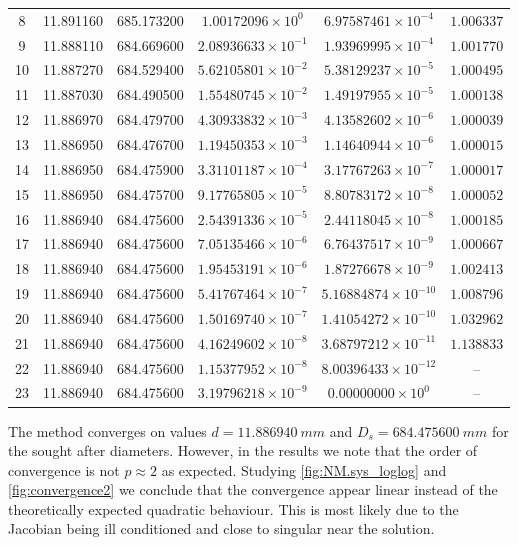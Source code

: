 \documentclass[11pt, a4paper]{article}
\theoremstyle{definition}
\begin{document}
\begin{table}[h!]
\begin{tabular}{cccccc}
 8  &  11.891160  & 685.173200  & $1.00172096\times 10^{0}$ & $6.97587461\times 10^{-4}$ & $1.006337$ \\
 9  &  11.888110  & 684.669600  & $2.08936633\times 10^{-1}$ & $1.93969995\times 10^{-4}$ & $1.001770$ \\
10  &  11.887270  & 684.529400  & $5.62105801\times 10^{-2}$ & $5.38129237\times 10^{-5}$ & $1.000495$ \\
11  &  11.887030  & 684.490500  & $1.55480745\times 10^{-2}$ & $1.49197955\times 10^{-5}$ & $1.000138$ \\
12  &  11.886970  & 684.479700  & $4.30933832\times 10^{-3}$ & $4.13582602\times 10^{-6}$ & $1.000039$ \\
13  &  11.886950  & 684.476700  & $1.19450353\times 10^{-3}$ & $1.14640944\times 10^{-6}$ & $1.000015$ \\
14  &  11.886950  & 684.475900  & $3.31101187\times 10^{-4}$ & $3.17767263\times 10^{-7}$ & $1.000017$ \\
15  &  11.886950  & 684.475700  & $9.17765805\times 10^{-5}$ & $8.80783172\times 10^{-8}$ & $1.000052$ \\
16  &  11.886940  & 684.475600  & $2.54391336\times 10^{-5}$ & $2.44118045\times 10^{-8}$ & $1.000185$ \\
17  &  11.886940  & 684.475600  & $7.05135466\times 10^{-6}$ & $6.76437517\times 10^{-9}$ & $1.000667$ \\
18  &  11.886940  & 684.475600  & $1.95453191\times 10^{-6}$ & $1.87276678\times 10^{-9}$ & $1.002413$ \\
19  &  11.886940  & 684.475600  & $5.41767464\times 10^{-7}$ & $5.16884874\times 10^{-10}$ & $1.008796$ \\
20  &  11.886940  & 684.475600  & $1.50169740\times 10^{-7}$ & $1.41054272\times 10^{-10}$ & $1.032962$ \\
21  &  11.886940  & 684.475600  & $4.16249602\times 10^{-8}$ & $3.68797212\times 10^{-11}$ & $1.138833$ \\
22  &  11.886940  & 684.475600  & $1.15377952\times 10^{-8}$ & $8.00396433\times 10^{-12}$ & -- \\
23  &  11.886940  & 684.475600  & $3.19796218\times 10^{-9}$ & $0.00000000\times 10^{0}$ & -- \\
\hline
\end{tabular}
\end{table}

The method converges on values $d=11.886940\ mm$ and $D_s = 684.475600\ mm$ for the sought after diameters.
However, in the results we note that the order of convergence is not $p \approx 2$ as expected. Studying \cref{fig:NM.sys_loglog} and \cref{fig:convergence2} we conclude that the convergence appear linear instead of the theoretically expected quadratic behaviour. This is most likely due to the Jacobian being ill conditioned and close to singular near the solution.
\end{document}
